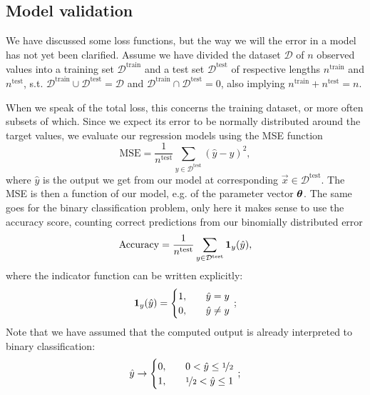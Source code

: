 \subsection{Model validation} %

We have discussed some loss functions, but the way we will  the error in a model has not yet been clarified. Assume we have divided the dataset $\mathcal{D}$ of $n$ observed values into a training set $\mathcal{D}^\mathrm{train}$ and a test set $\mathcal{D}^\mathrm{test}$ of respective lengths $n^\mathrm{train}$ and $n^\mathrm{test}$, s.t. $ \mathcal{D}^\mathrm{train} \cup\mathcal{D}^\mathrm{test} = \mathcal{D}$ and $\mathcal{D}^\mathrm{train} \cap\mathcal{D}^\mathrm{test} = 0 $, also implying $n^\mathrm{train}+n^\mathrm{test}=n$.

When we speak of the total loss, this concerns the training dataset, or more often subsets of which. Since we expect its error to be normally distributed around the target values, we evaluate our regression models using the MSE function
\begin{equation}\label{eq:MSE}
    \mathrm{MSE} = \frac{1}{n^\mathrm{test}} \sum_{y\in \mathcal{D}^\mathrm{test}} (\hat{y} - y)^2,
\end{equation}
where $\hat{y}$ is the output we get from our model at corresponding $\vec{x}\in\mathcal{D}^\mathrm{test}$. The MSE is then a function of our model, e.g. of the parameter vector $\boldsymbol{\theta}$. The same goes for the binary classification problem, only here it makes sense to use the accuracy score, counting correct predictions from our binomially distributed error
\begin{equation}\label{eq:accuracy}
    \mathrm{Accuracy} = \frac{1}{n^\mathrm{test}} \sum_{y\in \mathcal{D}^\mathrm{test}} \boldsymbol{1}_{y}(\hat{y}),
\end{equation}
where the indicator function can be written explicitly:
\begin{equation}\label{eq:indicator}
    \boldsymbol{1}_y(\hat{y}) = \begin{cases}
        1, \quad & \hat{y} = y \\
        0, \quad & \hat{y} \neq y
    \end{cases}\, ;
\end{equation}
Note that we have assumed that the computed output is already interpreted to binary classification:
\begin{equation}\label{eq:binary_y}
    \hat{y} \to \begin{cases}
        0, \quad & 0 <\hat{y} \leq \nicefrac{1}{2} \\
        1, \quad & \nicefrac{1}{2} < \hat{y} \leq 1
    \end{cases}\, ;
\end{equation}

